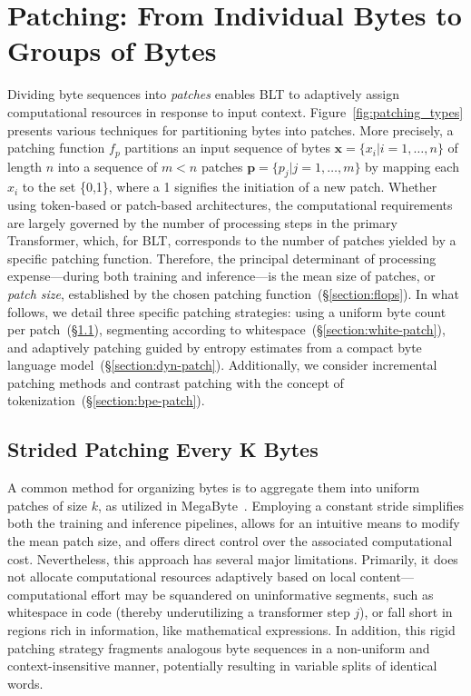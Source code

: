 \section{Patching: From Individual Bytes to Groups of Bytes}
\label{section:patching}

Dividing byte sequences into \textit{patches} enables {\textsc BLT} to adaptively assign computational resources in response to input context. Figure~\ref{fig:patching_types} presents various techniques for partitioning bytes into patches. More precisely, a patching function $f_p$ partitions an input sequence of bytes $\pmb{x} = \{x_i | i = 1, \ldots, n\}$ of length $n$ into a sequence of $m < n$ patches $\pmb{p} = \{p_j | j = 1, \ldots, m\}$ by mapping each $x_i$ to the set \{0,1\}, where a 1 signifies the initiation of a new patch. Whether using token-based or patch-based architectures, the computational requirements are largely governed by the number of processing steps in the primary Transformer, which, for {\textsc BLT}, corresponds to the number of patches yielded by a specific patching function. Therefore, the principal determinant of processing expense—during both training and inference—is the mean size of patches, or \textit{patch size}, established by the chosen patching function~(\S\ref{section:flops}).
In what follows, we detail three specific patching strategies: using a uniform byte count per patch~(\S\ref{section:static-patch}), segmenting according to whitespace~(\S\ref{section:white-patch}), and adaptively patching guided by entropy estimates from a compact byte language model~(\S\ref{section:dyn-patch}). Additionally, we consider incremental patching methods and contrast patching with the concept of tokenization~(\S\ref{section:bpe-patch}).

\subsection{Strided Patching Every K Bytes}
\label{section:static-patch}

A common method for organizing bytes is to aggregate them into uniform patches of size $k$, as utilized in MegaByte~\citep{yu2023megabyte}. Employing a constant stride simplifies both the training and inference pipelines, allows for an intuitive means to modify the mean patch size, and offers direct control over the associated computational cost. Nevertheless, this approach has several major limitations. Primarily, it does not allocate computational resources adaptively based on local content—computational effort may be squandered on uninformative segments, such as whitespace in code (thereby underutilizing a transformer step $j$), or fall short in regions rich in information, like mathematical expressions. In addition, this rigid patching strategy fragments analogous byte sequences in a non-uniform and context-insensitive manner, potentially resulting in variable splits of identical words.

